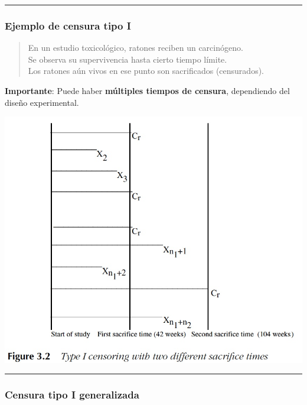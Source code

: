 \documentclass[
  letterpaper,
  DIV=11,
  numbers=noendperiod]{scrartcl}
\begin{document}
\begin{center}\rule{0.5\linewidth}{0.5pt}\end{center}

\subsubsection{Ejemplo de censura tipo
I}\label{ejemplo-de-censura-tipo-i}

\begin{quote}
En un estudio toxicológico, ratones reciben un carcinógeno.\\
Se observa su supervivencia hasta cierto tiempo límite.\\
Los ratones aún vivos en ese punto son sacrificados (censurados).
\end{quote}

\textbf{Importante}: Puede haber \textbf{múltiples tiempos de censura},
dependiendo del diseño experimental.

\begin{center}
\includegraphics[width=0.9\linewidth,height=\textheight,keepaspectratio]{figura/CensuraI-3.jpg}
\end{center}

\begin{center}\rule{0.5\linewidth}{0.5pt}\end{center}

\subsubsection{Censura tipo I
generalizada}\label{censura-tipo-i-generalizada}
\end{document}
